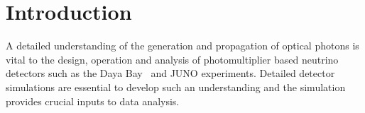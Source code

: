 \documentclass[a4paper]{jpconf}
\begin{document}
\section{Introduction}

A detailed understanding of the generation and propagation of optical 
photons is vital to the design, operation and analysis of photomultiplier
based neutrino detectors such as the Daya Bay~\cite{dyb} and JUNO\cite{juno} experiments. 
Detailed detector simulations are essential to develop such an understanding and the 
simulation provides crucial inputs to data analysis.  




%
%

%
%
%
%
%
%
%
%
%
%
  
\end{document}
